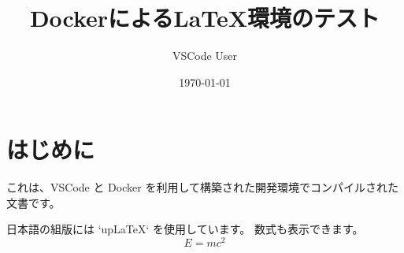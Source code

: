 \documentclass[uplatex, a4paper]{jsarticle}
\title{Dockerによる\LaTeX{}環境のテスト}
\author{VSCode User}
\date{\today}
\begin{document}
\maketitle

\section{はじめに}
これは、VSCode と Docker を利用して構築された開発環境でコンパイルされた文書です。

日本語の組版には `upLaTeX` を使用しています。
数式も表示できます。
$$ E = mc^2 $$
\end{document}
